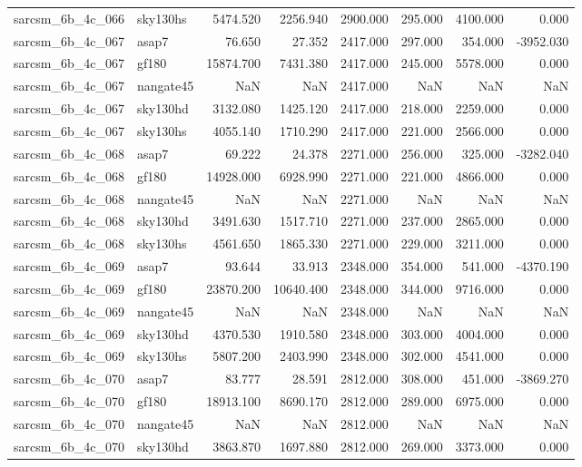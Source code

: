 \begin{tabular}{llrrrrrr}
sarcsm\_6b\_4c\_066 & sky130hs & 5474.520 & 2256.940 & 2900.000 & 295.000 & 4100.000 & 0.000 \\
sarcsm\_6b\_4c\_067 & asap7 & 76.650 & 27.352 & 2417.000 & 297.000 & 354.000 & -3952.030 \\
sarcsm\_6b\_4c\_067 & gf180 & 15874.700 & 7431.380 & 2417.000 & 245.000 & 5578.000 & 0.000 \\
sarcsm\_6b\_4c\_067 & nangate45 & NaN & NaN & 2417.000 & NaN & NaN & NaN \\
sarcsm\_6b\_4c\_067 & sky130hd & 3132.080 & 1425.120 & 2417.000 & 218.000 & 2259.000 & 0.000 \\
sarcsm\_6b\_4c\_067 & sky130hs & 4055.140 & 1710.290 & 2417.000 & 221.000 & 2566.000 & 0.000 \\
sarcsm\_6b\_4c\_068 & asap7 & 69.222 & 24.378 & 2271.000 & 256.000 & 325.000 & -3282.040 \\
sarcsm\_6b\_4c\_068 & gf180 & 14928.000 & 6928.990 & 2271.000 & 221.000 & 4866.000 & 0.000 \\
sarcsm\_6b\_4c\_068 & nangate45 & NaN & NaN & 2271.000 & NaN & NaN & NaN \\
sarcsm\_6b\_4c\_068 & sky130hd & 3491.630 & 1517.710 & 2271.000 & 237.000 & 2865.000 & 0.000 \\
sarcsm\_6b\_4c\_068 & sky130hs & 4561.650 & 1865.330 & 2271.000 & 229.000 & 3211.000 & 0.000 \\
sarcsm\_6b\_4c\_069 & asap7 & 93.644 & 33.913 & 2348.000 & 354.000 & 541.000 & -4370.190 \\
sarcsm\_6b\_4c\_069 & gf180 & 23870.200 & 10640.400 & 2348.000 & 344.000 & 9716.000 & 0.000 \\
sarcsm\_6b\_4c\_069 & nangate45 & NaN & NaN & 2348.000 & NaN & NaN & NaN \\
sarcsm\_6b\_4c\_069 & sky130hd & 4370.530 & 1910.580 & 2348.000 & 303.000 & 4004.000 & 0.000 \\
sarcsm\_6b\_4c\_069 & sky130hs & 5807.200 & 2403.990 & 2348.000 & 302.000 & 4541.000 & 0.000 \\
sarcsm\_6b\_4c\_070 & asap7 & 83.777 & 28.591 & 2812.000 & 308.000 & 451.000 & -3869.270 \\
sarcsm\_6b\_4c\_070 & gf180 & 18913.100 & 8690.170 & 2812.000 & 289.000 & 6975.000 & 0.000 \\
sarcsm\_6b\_4c\_070 & nangate45 & NaN & NaN & 2812.000 & NaN & NaN & NaN \\
sarcsm\_6b\_4c\_070 & sky130hd & 3863.870 & 1697.880 & 2812.000 & 269.000 & 3373.000 & 0.000 \\

\end{tabular}
